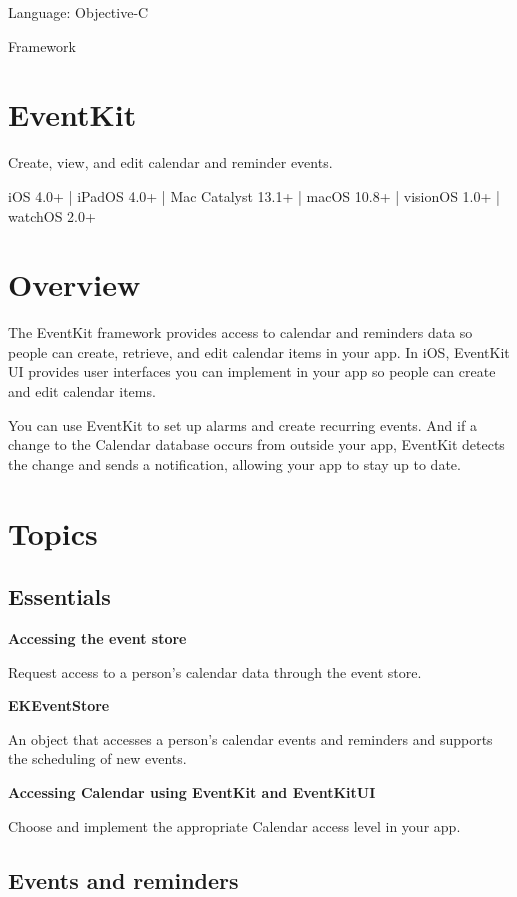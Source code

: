 \documentclass{article}
\title{}
\author{}
\date{}
\begin{document}
Language: Objective-C

Framework

\section*{EventKit}

Create, view, and edit calendar and reminder events.

iOS 4.0+ | iPadOS 4.0+ | Mac Catalyst 13.1+ | macOS 10.8+ | visionOS 1.0+ | watchOS 2.0+

\section*{Overview}

The EventKit framework provides access to calendar and reminders data so people can create, retrieve, and edit calendar items in your app. In iOS, EventKit UI provides user interfaces you can implement in your app so people can create and edit calendar items.

You can use EventKit to set up alarms and create recurring events. And if a change to the Calendar database occurs from outside your app, EventKit detects the change and sends a notification, allowing your app to stay up to date.

\section*{Topics}

\subsection*{Essentials}

\textbf{Accessing the event store}

Request access to a person's calendar data through the event store.

\textbf{EKEventStore}

An object that accesses a person's calendar events and reminders and supports the scheduling of new events.

\textbf{Accessing Calendar using EventKit and EventKitUI}

Choose and implement the appropriate Calendar access level in your app.

\subsection*{Events and reminders}
\end{document}
